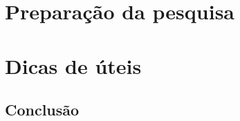 \documentclass[
	12pt,				%
	openright,			%
	oneside,			%
	a4paper,			%
	french,				%
	spanish,			%
	english,			%
	brazil				%
	]{abntex2}
\begin{document}
\part{Preparação da pesquisa}



\part{Dicas de úteis}




\chapter*[Conclusão]{Conclusão}


\postextual


\end{document}
